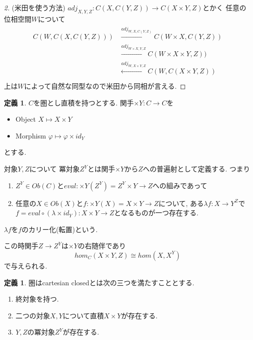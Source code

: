 \documentclass[dvipdfmx,a4paper,11pt]{article}
\theoremstyle{definition}
\newtheorem{dfn}[thm]{定義}
\begin{document}
\begin{proof}
[2](米田を使う方法)
$adj_{X,Y,Z}: C(X, C(Y,Z)) \to C(X \times Y, Z) $とかく
任意の位相空間$W$について
\begin{align*}
\begin{split}
C(W, C(X, C(Y,Z)))
&\overset{adj_{W,X,C(Y,Z)}}{\longrightarrow} 
C(W\times X , C(Y,Z))\\
&\overset{adj_{W\times X,Y,Z}}{\longrightarrow} 
C(W\times X  \times Y,Z))\\
&\overset{adj_{W,X\times Y,Z}}{\longleftarrow} 
C(W, C(X \times Y,Z))\\
\end{split}
\end{align*}
上は$W$によって自然な同型なので米田から同相が言える. 
\end{proof}

 \begin{tcolorbox}
 [colback = white, colframe = green!35!black, fonttitle = \bfseries,breakable = true]
\begin{dfn}
 $C$を圏とし直積を持つとする. 
 関手$\times Y : C \to C$を
 \begin{itemize}
 \item Object $X \mapsto X \times Y$
 \item Morphism $\varphi \mapsto \varphi \times  id_{Y}$
 \end{itemize}
 とする.

対象$Y,Z$について
 冪対象$Z^Y$とは関手$ \times Y$から$Z$への普遍射として定義する. 
つまり
 \begin{enumerate}
 \item $Z^Y \in Ob(C)$と$eval : \times Y(Z^Y) = Z^Y \times Y \to Z$への組みであって
 \item 任意の$X \in Ob(X)$と$f: \times Y(X) = X \times Y \to Z$について, ある$\lambda f : X \to Y^{Z}$で$f = eval \circ (\lambda \times id_Y) : X \times Y \to Z$となるものが一つ存在する.
 \end{enumerate}
$\lambda f$を$f$のカリー化(転置)という. 

この時関手$Z \to Z^Y$は$\times Y$の右随伴であり
$$
hom_C(X \times Y, Z) \cong hom(X,X^Y)
$$
で与えられる. 
\end{dfn}
\end{tcolorbox}

 \begin{tcolorbox}
 [colback = white, colframe = green!35!black, fonttitle = \bfseries,breakable = true]


\begin{dfn}
圏はcartesian closedとは次の三つを満たすこととする. 
\begin{enumerate}
\item 終対象を持つ. 
\item 二つの対象$X,Y$について直積$X \times Y$が存在する. 
\item $Y,Z$の冪対象$Z^Y$が存在する. 
\end{enumerate}
\end{dfn}
\end{tcolorbox}
\end{document}
